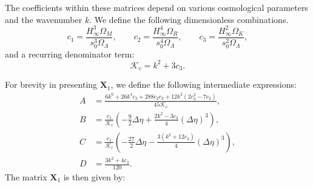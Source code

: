 \documentclass[%
 reprint,
 amsmath,amssymb,
 prd, %
]{revtex4-2}
\begin{document}
The coefficients within these matrices depend on various cosmological parameters and the wavenumber $k$. We define the following dimensionless combinations. 
\begin{equation}\label{eq:coeffs_c}
c_1 = \frac{H_{\infty}^3 \Omega_M}{s_0^3 \Omega_{\Lambda}}, \qquad
c_2 = \frac{H_{\infty}^4 \Omega_R}{s_0^4 \Omega_{\Lambda}}, \qquad
c_3 = \frac{H_{\infty}^2 \Omega_K}{s_0^2 \Omega_{\Lambda}},
\end{equation}
and a recurring denominator term:
\begin{equation}\label{eq:coeff_Kc}
\mathcal{K}_c = k^2 + 3c_3.
\end{equation}

For brevity in presenting $\mathbf{X}_1$, we define the following intermediate expressions:
\begin{align}\label{eq:ABCD_defs}
    A &= \frac{6k^6+26k^4c_3+288c_2c_3+12k^2(2c_3^2-7c_2)}{45\mathcal{K}_c}, \\
    B &= \frac{c_1}{\mathcal{K}_c} \left( -\frac{9}{2}\Delta\eta + \frac{2k^2-3c_3}{4}(\Delta\eta)^3 \right), \\
    C &= \frac{c_1}{\mathcal{K}_c} \left( -\frac{27}{2}\Delta\eta - \frac{3(k^2+12c_3)}{4}(\Delta\eta)^3 \right), \\
    D &= \frac{3k^2+4c_3}{120}.
\end{align}
The matrix $\mathbf{X}_1$ is then given by:
\end{document}
